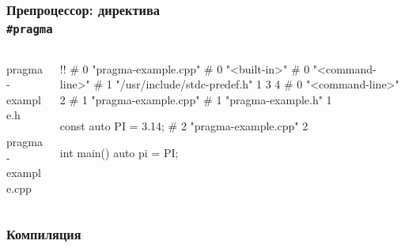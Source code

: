 \documentclass[compress]{beamer}
\begin{document}
\begin{frame}[fragile]

    \frametitle{Препроцессор: директива \\ \texttt{\#pragma}}

    \begin{columns}[T]

        \begin{column}{0.5\textwidth}

                {pragma-example.h}

                {pragma-example.cpp}

        \end{column}

        \begin{column}{0.5\textwidth}

            \begin{terminalwindow}
!!
# 0 "pragma-example.cpp"
# 0 "<built-in>"
# 0 "<command-line>"
# 1 "/usr/include/stdc-predef.h" 1 3 4
# 0 "<command-line>" 2
# 1 "pragma-example.cpp"
# 1 "pragma-example.h" 1


const auto PI = 3.14;
# 2 "pragma-example.cpp" 2




int main() {
    auto pi = PI;
}
            \end{terminalwindow}

        \end{column}

    \end{columns}

\end{frame}

\begin{frame}

    \frametitle{Компиляция}

    \centering


\end{frame}
\end{document}
